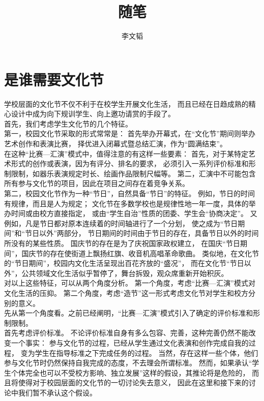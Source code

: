 \documentclass{article}
\author{李文韬}
\begin{document}
\title{随笔}
\maketitle
\tableofcontents
\newpage


\section{是谁需要文化节}
    学校层面的文化节不仅不利于在校学生开展文化生活，
    而且已经在日趋成熟的精心设计中成为向下规训学生、向上邀功请赏的手段了。\\
    
    首先，我们考虑学生文化节的几个特征。\\
    
    第一，校园文化节采取的形式常常是：
    首先举办开幕式，在“文化节”期间则举办艺术创作和表演比赛，
    择优进入闭幕式暨总结汇演，作为“圆满结束”。\\
    
    在这种“比赛—汇演”模式中，值得注意的有这样一些要素：
    首先，对于某特定艺术形式的创作或表演，因为有评分、排名的要求，
    必须引入一系列评价标准和形制限制，如器乐表演规定时长、绘画作品限制尺幅等。
    第二，汇演中不可能包含所有参与文化节的项目，因此在项目之间存在着竞争关系。\\

    第二，校园文化节作为一种“节日”，自然具备“节日”的特征。
    例如，节日的时间有规律，而且是人为规定；
    文化节在多数学校也是规律性地一年一度，具体的举办时间或由校方直接指定，
    或由“学生自治”性质的团委、学生会“协商决定”。
    又例如，凡是节日都对原本连续着的时间轴进行了一个分划，
    使之成为“节日期间”和“节日以外”两部分，
    节日期间的时间由于节日的存在，具备节日以外的时间所没有的某些性质。
    国庆节的存在是为了庆祝国家政权建立，
    在国庆“节日期间”，国庆节的存在使街道上飘扬红旗、收音机高唱革命歌曲。
    类似地，在文化节的“节日期间”，校园内文化生活呈现出百花齐放的“盛况”，
    而在文化节“节日以外”，公共领域文化生活似乎暂停了，舞台拆毁，观众席重新开始积灰。\\

    对以上这些特征，可以从两个角度分析。
    第一个角度，考虑“比赛—汇演”模式对文化生活的压抑。
    第二个角度，考虑“造节”这一形式考虑文化节对学生和校方分别的意义。\\

    先从第一个角度看。之前已经阐明，“比赛—汇演”模式引入了确定的评价标准和形制限制。\\

    首先考虑评价标准。
    不论评价标准自身有多么包容、完善，这种完善仍然不能改变一个事实：
    参与文化节的过程，已经从学生通过文化表演和创作完成自我的过程，
    变为学生在指导标准之下完成任务的过程。
    当然，存在这样一些个体，他们参与文化节时仍然保持自我完成的态度，不去理会所谓标准。
    然而，如果承认“学生个体完全也可以不受校方影响、独立发展”这样的假设，其推论将是危险的，
    而且将使得对于校园层面的文化节的一切讨论失去意义，
    因此在这里和接下来的讨论中我们暂不承认这个假设。\\
\end{document}
